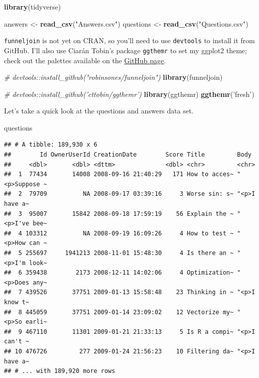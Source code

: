 \documentclass[]{article}
\newenvironment{Shaded}{\begin{snugshade}}{\end{snugshade}}
\newcommand{\KeywordTok}[1]{\textcolor[rgb]{0.13,0.29,0.53}{\textbf{#1}}}
\newcommand{\StringTok}[1]{\textcolor[rgb]{0.31,0.60,0.02}{#1}}
\newcommand{\CommentTok}[1]{\textcolor[rgb]{0.56,0.35,0.01}{\textit{#1}}}
\newcommand{\NormalTok}[1]{#1}
\begin{document}
\begin{Shaded}
\begin{Highlighting}[]
\KeywordTok{library}\NormalTok{(tidyverse)}

\NormalTok{answers <-}\StringTok{ }\KeywordTok{read_csv}\NormalTok{(}\StringTok{"Answers.csv"}\NormalTok{)}
\NormalTok{questions <-}\StringTok{ }\KeywordTok{read_csv}\NormalTok{(}\StringTok{"Questions.csv"}\NormalTok{)}
\end{Highlighting}
\end{Shaded}

\texttt{funneljoin} is not yet on CRAN, so you'll need to use
\texttt{devtools} to install it from GitHub. I'll also use Ciarán
Tobin's package \texttt{ggthemr} to set my ggplot2 theme; check out the
palettes available on the
\href{https://github.com/cttobin/ggthemr}{GitHub page}.

\begin{Shaded}
\begin{Highlighting}[]
\CommentTok{# devtools::install_github("robinsones/funneljoin")}
\KeywordTok{library}\NormalTok{(funneljoin)}
\end{Highlighting}
\end{Shaded}

\begin{Shaded}
\begin{Highlighting}[]
\CommentTok{# devtools::install_github('cttobin/ggthemr')}
\KeywordTok{library}\NormalTok{(ggthemr)}
\KeywordTok{ggthemr}\NormalTok{(}\StringTok{'fresh'}\NormalTok{)}
\end{Highlighting}
\end{Shaded}

Let's take a quick look at the questions and answers data set.

\begin{Shaded}
\begin{Highlighting}[]
\NormalTok{questions}
\end{Highlighting}
\end{Shaded}

\begin{verbatim}
## # A tibble: 189,930 x 6
##        Id OwnerUserId CreationDate        Score Title         Body         
##     <dbl>       <dbl> <dttm>              <dbl> <chr>         <chr>        
##  1  77434       14008 2008-09-16 21:40:29   171 How to acces~ "<p>Suppose ~
##  2  79709          NA 2008-09-17 03:39:16     3 Worse sin: s~ "<p>I have a~
##  3  95007       15842 2008-09-18 17:59:19    56 Explain the ~ "<p>I've bee~
##  4 103312          NA 2008-09-19 16:09:26     4 How to test ~ "<p>How can ~
##  5 255697     1941213 2008-11-01 15:48:30     4 Is there an ~ "<p>I'm look~
##  6 359438        2173 2008-12-11 14:02:06     4 Optimization~ "<p>Does any~
##  7 439526       37751 2009-01-13 15:58:48    23 Thinking in ~ "<p>I know t~
##  8 445059       37751 2009-01-14 23:09:02    12 Vectorize my~ "<p>So earli~
##  9 467110       11301 2009-01-21 21:33:13     5 Is R a compi~ "<p>I can't ~
## 10 476726         277 2009-01-24 21:56:23    10 Filtering da~ "<p>I have a~
## # ... with 189,920 more rows
\end{verbatim}
\end{document}
